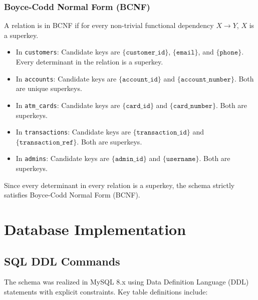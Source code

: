 \documentclass[11pt,a4paper]{report}
\begin{document}
\subsubsection{Boyce-Codd Normal Form (BCNF)}
A relation is in BCNF if for every non-trivial functional dependency $X \rightarrow Y$, $X$ is a superkey.
\begin{itemize}
    \item In \texttt{customers}: Candidate keys are $\{\texttt{customer\_id}\}$, $\{\texttt{email}\}$, and $\{\texttt{phone}\}$. Every determinant in the relation is a superkey.
    \item In \texttt{accounts}: Candidate keys are $\{\texttt{account\_id}\}$ and $\{\texttt{account\_number}\}$. Both are unique superkeys.
    \item In \texttt{atm\_cards}: Candidate keys are $\{\texttt{card\_id}\}$ and $\{\texttt{card\_number}\}$. Both are superkeys.
    \item In \texttt{transactions}: Candidate keys are $\{\texttt{transaction\_id}\}$ and $\{\texttt{transaction\_ref}\}$. Both are superkeys.
    \item In \texttt{admins}: Candidate keys are $\{\texttt{admin\_id}\}$ and $\{\texttt{username}\}$. Both are superkeys.
\end{itemize}
Since every determinant in every relation is a superkey, the schema strictly satisfies Boyce-Codd Normal Form (BCNF).

\newpage

\section{Database Implementation}

\subsection{SQL DDL Commands}
The schema was realized in MySQL 8.x using Data Definition Language (DDL) statements with explicit constraints. Key table definitions include:
\end{document}
